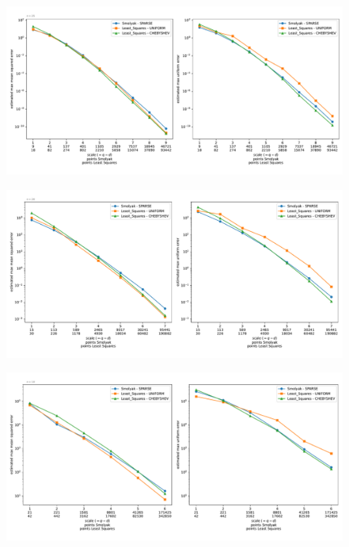 \documentclass[12pt, oneside]{amsart}
\theoremstyle{definition}
\theoremstyle{remark}
\numberwithin{equation}{section}
\begin{document}

\begin{figure}[h]
	\centering
	\includegraphics[width=\linewidth]{figures/zhou/dim4/max_error_distribution_fixed_dim}
	\caption{}
	\label{fig:zhou_dim4}
\end{figure}

\begin{figure}[h]
	\centering
	\includegraphics[width=\linewidth]{figures/zhou/dim7/max_error_distribution_fixed_dim}
	\caption{}
	\label{fig:zhou_dim7}
\end{figure}

\begin{figure}[h]
	\centering
	\includegraphics[width=\linewidth]{figures/zhou/dim10/max_error_distribution_fixed_dim}
	\caption{}
	\label{fig:zhou_dim10}
\end{figure}
\end{document}

